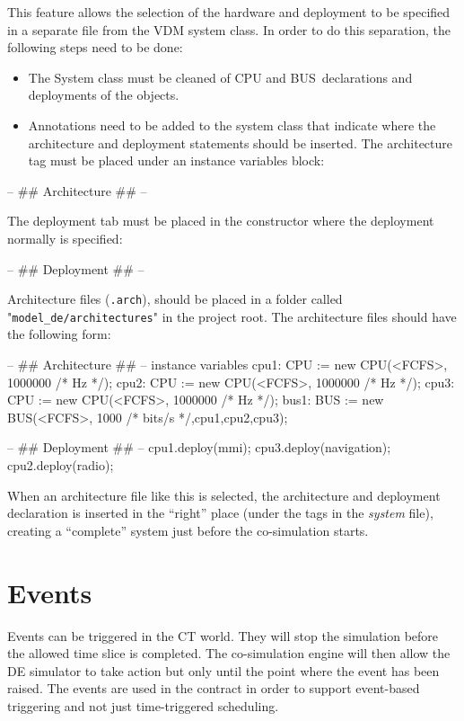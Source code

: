 \documentclass{crescendorepchap}
\begin{document}
This feature allows the selection of the hardware and deployment to be
specified in a separate file from the VDM system class.
In order to do this separation, the following steps need to be done:

\begin{itemize}
\item
  The System class must be cleaned of CPU and BUS~declarations and
  deployments of the objects.
\item
  Annotations need to be added to the system class that indicate where
  the architecture and deployment statements should be inserted. The architecture tag must
  be placed under an instance variables block:
\end{itemize}

\begin{vdmrt}
-- ## Architecture ## -- 
\end{vdmrt}

The deployment tab must be placed in the constructor where the
deployment normally is specified:

\begin{vdmrt}
-- ## Deployment ## -- 
\end{vdmrt}

Architecture files (\texttt{.arch}), should be placed in a folder called
"\texttt{model\_de/architectures}" in the project root. The
architecture files should have the following form:

\begin{vdmrt}
-- ## Architecture ## --
instance variables
  cpu1: CPU := new CPU(<FCFS>, 1000000 /* Hz */);
  cpu2: CPU := new CPU(<FCFS>, 1000000 /* Hz */);
  cpu3: CPU := new CPU(<FCFS>, 1000000 /* Hz */);
  bus1: BUS := new BUS(<FCFS>, 1000 /* bits/s */,{cpu1,cpu2,cpu3});

-- ## Deployment ## --
cpu1.deploy(mmi);
cpu3.deploy(navigation);
cpu2.deploy(radio);
\end{vdmrt}

When an architecture file like this is selected, the architecture and
deployment declaration is inserted in the ``right'' place (under the
tags in the \emph{system} file), creating a ``complete'' system just
before the co-simulation starts.

\section{Events}

Events can be triggered in the CT world. They will stop the simulation
before the allowed time slice is completed. The co-simulation engine
will then allow the DE simulator to take action but only until the point
where the event has been raised. The events are used in the contract in
order to support event-based triggering and not just time-triggered
scheduling.
\end{document}
